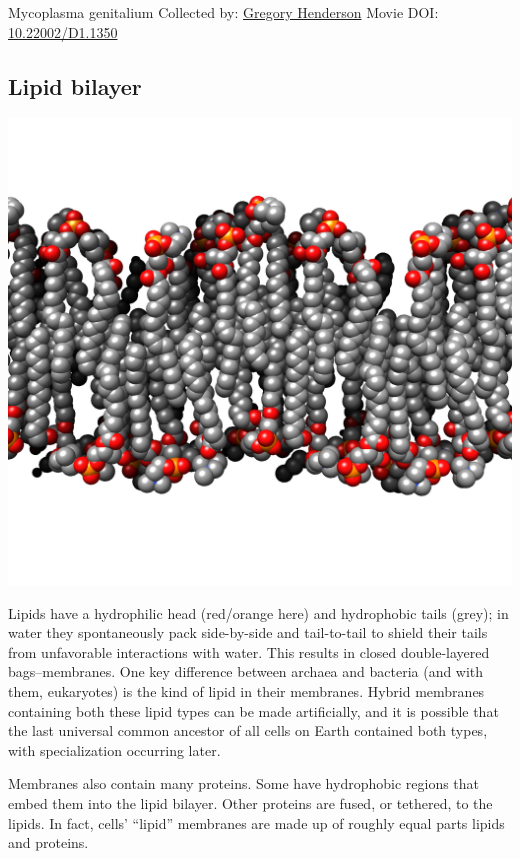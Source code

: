 \documentclass[]{tufte-book}
\begin{document}
\label{fig:2-1}Mycoplasma genitalium Collected by: \protect\hyperlink{gregory_henderson}{Gregory Henderson} Movie DOI: \href{https://doi.org/10.22002/D1.1350}{10.22002/D1.1350}

\hypertarget{Lipid_bilayer}{%
\subsection{Lipid bilayer}\label{Lipid_bilayer}}

\includegraphics{img/schematics/2_1_1}

Lipids have a hydrophilic head (red/orange here) and hydrophobic tails (grey); in water they spontaneously pack side-by-side and tail-to-tail to shield their tails from unfavorable interactions with water. This results in closed double-layered bags--membranes. One key difference between archaea and bacteria (and with them, eukaryotes) is the kind of lipid in their membranes. Hybrid membranes containing both these lipid types can be made artificially, and it is possible that the last universal common ancestor of all cells on Earth contained both types, with specialization occurring later.

Membranes also contain many proteins. Some have hydrophobic regions that embed them into the lipid bilayer. Other proteins are fused, or tethered, to the lipids. In fact, cells' ``lipid'' membranes are made up of roughly equal parts lipids and proteins.
\end{document}
